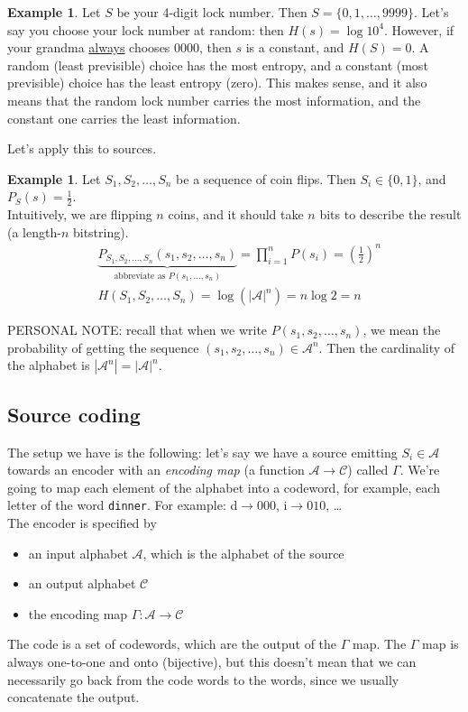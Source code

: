 \documentclass{report}
\theoremstyle{plain}
\theoremstyle{definition}
\newtheorem{exmp}[thm]{Example}
\theoremstyle{remark}
\begin{document}
\begin{exmp}
	Let $S$ be your 4-digit lock number. Then $S = \{0, 1, \ldots, 9999\}$. Let's say you choose your lock number at random: then $H(s) = \log 10^4$. However, if your grandma \ul{always} chooses $0000$, then $s$ is a constant, and $H(S) = 0$. A random (least previsible) choice has the most entropy, and a constant (most previsible) choice has the least entropy (zero). This makes sense, and it also means that the random lock number carries the most information, and the constant one carries the least information.
\end{exmp}

Let's apply this to sources.

\begin{exmp}
	Let $S_1, S_2, \ldots, S_n$ be a sequence of coin flips. Then $S_i \in \{0, 1\}$, and $P_S(s) = \frac12$. \\
Intuitively, we are flipping $n$ coins, and it should take $n$ bits to describe the result (a length-$n$ bitstring).
\begin{align*}
	&\underbrace{P_{S_1, S_2, \ldots, S_n}(s_1, s_2, \ldots, s_n)}_{\text{abbreviate as } P(s_1, \ldots, s_n)} = \prod_{i=1}^n P(s_i) = \left(\frac12 \right)^n \\
	&H(S_1, S_2, \ldots, S_n) = \log\left(|\mathcal A|^n \right) = n \log 2 = n
\end{align*}
\end{exmp}

PERSONAL NOTE: recall that when we write $P(s_1, s_2, \ldots, s_n)$, we mean the probability of getting the sequence $(s_1, s_2, \ldots, s_n) \in \mathcal A^n$. Then the cardinality of the alphabet is $|\mathcal A^n| = |\mathcal A|^n$.

\subsection{Source coding}
The setup we have is the following: let's say we have a source emitting $S_i \in \mathcal A$ towards an encoder with an \emph{encoding map} (a function $\mathcal A \to \mathcal C$) called $\Gamma$. We're going to map each element of the alphabet into a codeword, for example, each letter of the word \texttt{dinner}. For example: d$\to 000$, i$\to 010$, \dots \\
The encoder is specified by
\begin{itemize}
	\item an input alphabet $\mathcal A$, which is the alphabet of the source
	\item an output alphabet $\mathcal C$
	\item the encoding map $\Gamma : \mathcal A \to \mathcal C$
\end{itemize}
The code is a set of codewords, which are the output of the $\Gamma$ map. The $\Gamma$ map is always one-to-one and onto (bijective), but this doesn't mean that we can necessarily go back from the code words to the words, since we usually concatenate the output.
\end{document}
